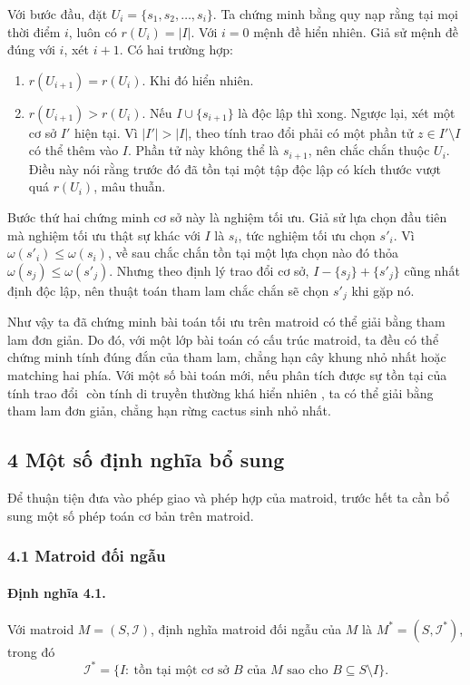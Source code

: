 \documentclass[11pt]{article}
\begin{document}
Với bước đầu, đặt \(U_i=\{s_1,s_2,\ldots,s_i\}\). Ta chứng minh bằng quy nạp
rằng tại mọi thời điểm \(i\), luôn có \(r(U_i)=|I|\). Với \(i=0\) mệnh đề hiển
nhiên. Giả sử mệnh đề đúng với \(i\), xét \(i+1\). Có hai trường hợp:
\begin{enumerate}
  \item \(r(U_{i+1})=r(U_i)\). Khi đó hiển nhiên.
  \item \(r(U_{i+1})>r(U_i)\). Nếu \(I\cup\{s_{i+1}\}\) là độc lập thì xong.
  Ngược lại, xét một cơ sở \(I'\) hiện tại. Vì \(|I'|>|I|\), theo tính trao đổi
  phải có một phần tử \(z\in I'\setminus I\) có thể thêm vào \(I\). Phần tử này
  không thể là \(s_{i+1}\), nên chắc chắn thuộc \(U_i\). Điều này nói rằng trước
  đó đã tồn tại một tập độc lập có kích thước vượt quá \(r(U_i)\), mâu thuẫn.
\end{enumerate}

Bước thứ hai chứng minh cơ sở này là nghiệm tối ưu. Giả sử lựa chọn đầu tiên mà
nghiệm tối ưu thật sự khác với \(I\) là \(s_i\), tức nghiệm tối ưu chọn
\(s'_i\). Vì \(\omega(s'_i)\le \omega(s_i)\), về sau chắc chắn tồn tại một lựa
chọn nào đó thỏa \(\omega(s_j)\le \omega(s'_j)\). Nhưng theo định lý trao đổi cơ
sở, \(I-\{s_j\}+\{s'_j\}\) cũng nhất định độc lập, nên thuật toán tham lam chắc
chắn sẽ chọn \(s'_j\) khi gặp nó.

Như vậy ta đã chứng minh bài toán tối ưu trên matroid có thể giải bằng tham lam
đơn giản. Do đó, với một lớp bài toán có cấu trúc matroid, ta đều có thể chứng
minh tính đúng đắn của tham lam, chẳng hạn cây khung nhỏ nhất hoặc matching hai
phía. Với một số bài toán mới, nếu phân tích được sự tồn tại của tính trao đổi
\( \) còn tính di truyền thường khá hiển nhiên \( \), ta có thể giải bằng tham
lam đơn giản, chẳng hạn rừng cactus sinh nhỏ nhất.

\subsection*{4 Một số định nghĩa bổ sung}

Để thuận tiện đưa vào phép giao và phép hợp của matroid, trước hết ta cần bổ
sung một số phép toán cơ bản trên matroid.

\subsubsection*{4.1 Matroid đối ngẫu}

\paragraph{Định nghĩa 4.1.}
Với matroid \(M=(S,\mathcal I)\), định nghĩa matroid đối ngẫu của \(M\) là
\(M^*=(S,\mathcal I^*)\), trong đó
\[
  \mathcal I^*=\{I:\ \text{tồn tại một cơ sở }B\text{ của }M
  \text{ sao cho }B\subseteq S\setminus I\}.
\]
\end{document}
